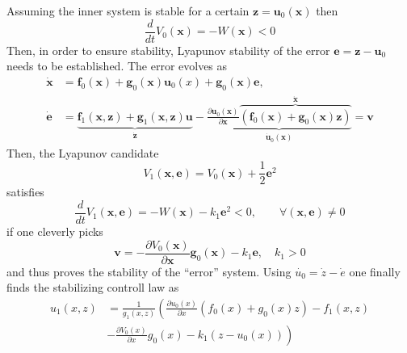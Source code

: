 \newpar{}
Assuming the inner system is stable for a certain $\mathbf{z} = \mathbf{u}_0(\mathbf{x})$ then
\noindent\begin{equation*}
    \frac{d}{dt} V_0(\mathbf{x}) = -W(\mathbf{x}) < 0
\end{equation*}
Then, in order to ensure stability, Lyapunov stability of the error $\mathbf{e} = \mathbf{z}-\mathbf{u}_0$ needs to be established.
The error evolves as
\begin{align*}
    \dot{\mathbf{x}} & =\mathbf{f}_{0}(\mathbf{x})+\mathbf{g}_{0}(\mathbf{x})\mathbf{u}_{0}(x)+\mathbf{g}_{0}(\mathbf{x})\mathbf{e},                                                                                                                                                                                                                                              \\
    \dot{\mathbf{e}} & =\underbrace{\mathbf{f}_{1}(\mathbf{x},\mathbf{z})+\mathbf{g}_{1}(\mathbf{x},\mathbf{z})\mathbf{u}}_{\dot{\mathbf{z}}}-\underbrace{\frac{\partial \mathbf{u}_{0}(\mathbf{x})}{\partial \mathbf{x}}\overbrace{\left(\mathbf{f}_{0}(\mathbf{x})+\mathbf{g}_{0}(\mathbf{x})\mathbf{z}\right)}^{\dot{\mathbf{x}}}}_{\dot{\mathbf{u}}_0(\mathbf{x})}=\mathbf{v}
\end{align*}
Then, the Lyapunov candidate
\noindent\begin{equation*}
    V_1(\mathbf{x}, \mathbf{e}) = V_0(\mathbf{x})+\frac{1}{2} \mathbf{e}^2
\end{equation*}
satisfies
\noindent\begin{equation*}
    \frac{d}{dt}V_1(\mathbf{x}, \mathbf{e}) = -W(\mathbf{x}) - k_1 \mathbf{e}^2 <0 ,\qquad \forall(\mathbf{x},\mathbf{e}) \neq 0
\end{equation*}
if one cleverly picks
\begin{equation*}
    \mathbf{v}=-\frac{\partial V_0(\mathbf{x})}{\partial \mathbf{x}}\mathbf{g}_0(\mathbf{x})-k_1\mathbf{e},\quad k_1>0
\end{equation*}
and thus proves the stability of the ``error'' system.
Using $\dot{u_0}=\dot{z}-\dot{e}$ one finally finds the stabilizing controll law as
\begin{align*}
    u_1(x,z) & = \frac{1}{g_1(x,z)}\left(\frac{\partial u_0(x)}{\partial x}\left(f_0(x)+g_0(x)z\right)-f_1(x,z) \right. \\
             & \left. -\frac{\partial V_0(x)}{\partial x}g_0(x)-k_1(z-u_0(x))\right)
\end{align*}

